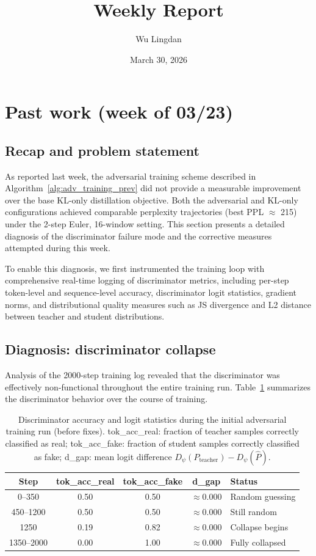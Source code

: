 \documentclass{article}
\title{Weekly Report}
\author{Wu Lingdan}
\date{March 30, 2026}
\begin{document}
\maketitle

\section{Past work (week of 03/23)}

\subsection{Recap and problem statement}

As reported last week, the adversarial training scheme described in Algorithm~\ref{alg:adv_training_prev} did not provide a measurable improvement over the base KL-only distillation objective. Both the adversarial and KL-only configurations achieved comparable perplexity trajectories (best PPL $\approx$ 215) under the 2-step Euler, 16-window setting. This section presents a detailed diagnosis of the discriminator failure mode and the corrective measures attempted during this week.

To enable this diagnosis, we first instrumented the training loop with comprehensive real-time logging of discriminator metrics, including per-step token-level and sequence-level accuracy, discriminator logit statistics, gradient norms, and distributional quality measures such as JS divergence and L2 distance between teacher and student distributions.

\subsection{Diagnosis: discriminator collapse}

Analysis of the 2000-step training log revealed that the discriminator was effectively non-functional throughout the entire training run. Table~\ref{tab:disc_collapse} summarizes the discriminator behavior over the course of training.

\begin{table}[t]
\centering
\caption{Discriminator accuracy and logit statistics during the initial adversarial training run (before fixes). tok\_acc\_real: fraction of teacher samples correctly classified as real; tok\_acc\_fake: fraction of student samples correctly classified as fake; d\_gap: mean logit difference $D_\psi(P_\text{teacher}) - D_\psi(\hat{P})$.}
\label{tab:disc_collapse}
\begin{tabular}{ccccl}
\toprule
\textbf{Step} & \textbf{tok\_acc\_real} & \textbf{tok\_acc\_fake} & \textbf{d\_gap} & \textbf{Status} \\
\midrule
0--350     & 0.50 & 0.50 & $\approx 0.000$ & Random guessing \\
450--1200  & 0.50 & 0.50 & $\approx 0.000$ & Still random \\
1250       & 0.19 & 0.82 & $\approx 0.000$ & Collapse begins \\
1350--2000 & 0.00 & 1.00 & $\approx 0.000$ & Fully collapsed \\
\bottomrule
\end{tabular}
\end{table}
\end{document}
